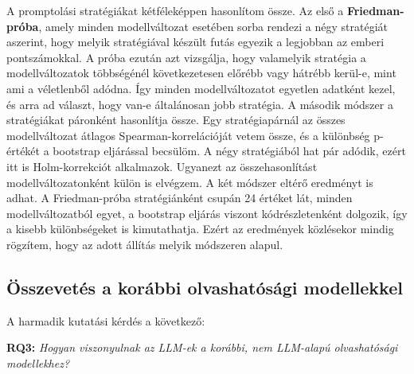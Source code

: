\documentclass[
]{elteikthesis}[2024/04/26]
\begin{document}
A promptolási stratégiákat kétféleképpen hasonlítom össze. Az első a
\textbf{Friedman-próba}, amely minden modellváltozat esetében sorba rendezi a
négy stratégiát aszerint, hogy melyik stratégiával készült futás egyezik a
legjobban az emberi pontszámokkal. A próba ezután azt vizsgálja, hogy valamelyik
stratégia a modellváltozatok többségénél következetesen előrébb vagy hátrébb
kerül-e, mint ami a véletlenből adódna. Így minden modellváltozatot egyetlen
adatként kezel, és arra ad választ, hogy van-e általánosan jobb stratégia. A
második módszer a stratégiákat páronként hasonlítja össze. Egy stratégiapárnál
az összes modellváltozat átlagos Spearman-korrelációját vetem össze, és a
különbség p-értékét a bootstrap eljárással becsülöm. A négy stratégiából hat pár
adódik, ezért itt is Holm-korrekciót alkalmazok. Ugyanezt az összehasonlítást
modellváltozatonként külön is elvégzem. A két módszer eltérő eredményt is adhat.
A Friedman-próba stratégiánként csupán 24 értéket lát, minden modellváltozatból
egyet, a bootstrap eljárás viszont kódrészletenként dolgozik, így a
kisebb különbségeket is kimutathatja. Ezért az eredmények közlésekor mindig
rögzítem, hogy az adott állítás melyik módszeren alapul.

\subsection{Összevetés a korábbi olvashatósági modellekkel}

A harmadik kutatási kérdés a következő: %

\textbf{RQ3:} \textit{Hogyan viszonyulnak az LLM-ek a korábbi, nem LLM-alapú
olvashatósági modellekhez?}
\end{document}

